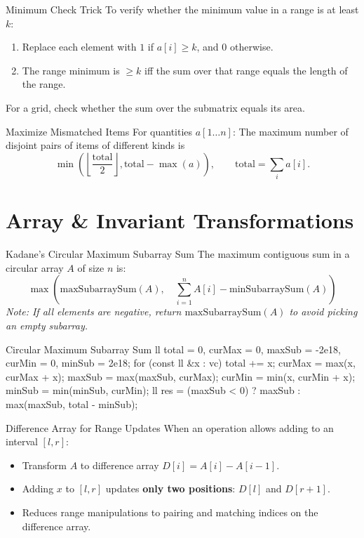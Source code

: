\documentclass[10pt]{article}
\newcommand{\complexity}[1]{%
  \tcbox[on line,
    colback=tagbg,
    colframe=tagbg,
    boxrule=0pt,
    arc=2pt,
    boxsep=0pt,
    left=3.5pt, right=3.5pt, top=1.5pt, bottom=1.5pt
  ]{\color{tagtext}\scriptsize\bfseries\ensuremath{#1}}%
}
\begin{document}
\begin{conceptbox}{Minimum Check Trick}
    To verify whether the minimum value in a range is at least $k$:
    \begin{enumerate}
        \item Replace each element with $1$ if $a[i] \geq k$, and $0$ otherwise.
        \item The range minimum is $\geq k$ iff the sum over that range equals the length of the range.
    \end{enumerate}
    For a grid, check whether the sum over the submatrix equals its area.
\end{conceptbox}

\begin{conceptbox}{Maximize Mismatched Items}
    For quantities $a[1 \ldots n]$:
    The maximum number of disjoint pairs of items of different kinds is
    \[ \min\left(\left\lfloor\frac{\text{total}}{2}\right\rfloor, \text{total} - \max(a)\right), \qquad \text{total} = \sum_i a[i]. \]
\end{conceptbox}

\newpage
\section{Array \& Invariant Transformations}

\begin{conceptbox}{Kadane's Circular Maximum Subarray Sum}
    The maximum contiguous sum in a circular array $A$ of size $n$ is:
    \[ \max\left(\text{maxSubarraySum}(A), \quad \sum_{i=1}^n A[i] - \text{minSubarraySum}(A)\right) \]
    \textit{Note: If all elements are negative, return $\text{maxSubarraySum}(A)$ to avoid picking an empty subarray.}
\end{conceptbox}

\begin{vscode}{Circular Maximum Subarray Sum \complexity{O(N)}}
ll total = 0, curMax = 0, maxSub = -2e18, curMin = 0, minSub = 2e18;
for (const ll &x : vc) 
{
    total += x;
    curMax = max(x, curMax + x);
    maxSub = max(maxSub, curMax);
    curMin = min(x, curMin + x);
    minSub = min(minSub, curMin);
}
ll res = (maxSub < 0) ? maxSub : max(maxSub, total - minSub);
\end{vscode}


\begin{conceptbox}{Difference Array for Range Updates}
    When an operation allows adding to an interval $[l, r]$:
    \begin{itemize}
        \item Transform $A$ to difference array $D[i] = A[i] - A[i-1]$.
        \item Adding $x$ to $[l, r]$ updates \textbf{only two positions}: $D[l]$ and $D[r+1]$.
        \item Reduces range manipulations to pairing and matching indices on the difference array.
    \end{itemize}
\end{conceptbox}
\end{document}

